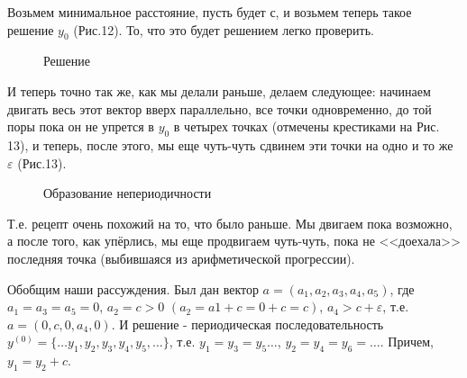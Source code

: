 \documentclass[russian]{lecture-notes}
\begin{document}
Возьмем минимальное расстояние, пусть будет с, и возьмем теперь такое решение $y_0$ (Рис.12). То, что это будет решением легко проверить.

\begin{figure}[h!]
\caption{Решение} 
\end{figure}
И теперь точно так же, как мы делали раньше, делаем следующее: начинаем двигать весь этот вектор вверх
параллельно, все точки одновременно, до той поры пока он не упрется в $y_0$ в четырех точках (отмечены крестиками на Рис. 13), и теперь, после
этого, мы еще чуть-чуть сдвинем эти точки на одно и то же $\varepsilon$ (Рис.13).

\begin{figure}[h!]
\caption{Образование непериодичности}
\label{fig:image}
\end{figure}
Т.е. рецепт
очень похожий на то, что было раньше. Мы двигаем пока возможно, а после того, как упёрлись, мы еще продвигаем чуть-чуть, пока не <<доехала>> последняя точка (выбившаяся из арифметической прогрессии).

Обобщим наши рассуждения.
Был дан вектор $a=(a_1,a_2,a_3,a_4,a_5)$, где $a_1=a_3=a_5=0$, $a_2=c>0$  $(a_2=a1+c=0+c=c)$,  $a_4>c+\varepsilon$, т.е. $a=(0,c,0,a_4,0)$. И решение - периодическая последовательность $y^{(0)}=\{\ldots y_1,y_2,y_3,y_4,y_5,\ldots\}$, т.е. $y_1=y_3=y_5\ldots$, $y_2=y_4=y_6=\ldots$. Причем, $y_1=y_2+c$.
\end{document}
